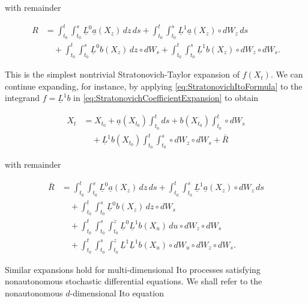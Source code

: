 \noindent with remainder

\begin{equation} \label{eq:StratonovichRemainderFirst}
\begin{split}
    R &= \int_{t_0}^t \int_{t_0}^s \underline{L}^0 \underline{a}(X_z) \, dz \, ds + \int_{t_0}^t \int_{t_0}^s \underline{L}^1 \underline{a}(X_z) \circ dW_z \, ds \\
    &\quad + \int_{t_0}^t \int_{t_0}^s \underline{L}^0 b(X_z) \, dz \circ dW_s + \int_{t_0}^t \int_{t_0}^s \underline{L}^1 b(X_z) \circ dW_z \circ dW_s.
\end{split}
\end{equation}

\noindent This is the simplest nontrivial Stratonovich-Taylor expansion of \(f(X_t)\). We can continue expanding, for instance, by applying \eqref{eq:StratonovichItoFormula} to the integrand \(f = \underline{L}^1 b\) in \eqref{eq:StratonovichCoefficientExpansion} to obtain

\begin{equation} \label{eq:StratonovichNextExpansion}
\begin{split}
    X_t &= X_{t_0} + \underline{a}(X_{t_0}) \int_{t_0}^t ds + b(X_{t_0}) \int_{t_0}^t \circ dW_s \\
    &\quad + \underline{L}^1 b(X_{t_0}) \int_{t_0}^t \int_{t_0}^s \circ dW_z \circ dW_s + \bar{R}
\end{split}
\end{equation}

\noindent with remainder

\begin{equation} \label{eq:StratonovichRemainderSecond}
\begin{split}
    \bar{R} &= \int_{t_0}^t \int_{t_0}^s \underline{L}^0 \underline{a}(X_z) \, dz \, ds + \int_{t_0}^t \int_{t_0}^s \underline{L}^1 \underline{a}(X_z) \circ dW_z \, ds \\
    &\quad + \int_{t_0}^t \int_{t_0}^s \underline{L}^0 b(X_z) \, dz \circ dW_s \\
    &\quad + \int_{t_0}^t \int_{t_0}^s \int_{t_0}^z \underline{L}^0 \underline{L}^1 b(X_u) \, du \circ dW_z \circ dW_s \\
    &\quad + \int_{t_0}^t \int_{t_0}^s \int_{t_0}^z \underline{L}^1 \underline{L}^1 b(X_u) \circ dW_u \circ dW_z \circ dW_s.
\end{split}
\end{equation}

\noindent Similar expansions hold for multi-dimensional Ito processes satisfying nonautonomous stochastic differential equations. We shall refer to the nonautonomous \(d\)-dimensional Ito equation

